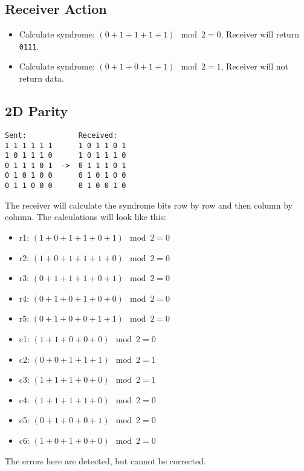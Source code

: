 \documentclass{article}
\begin{document}
\subsection*{Receiver Action}
\begin{itemize}
    \item Calculate syndrome: \((0 + 1 + 1 + 1 + 1) \mod 2 = 0\), Receiver will return \verb|0111|.
    \item Calculate syndrome: \((0 + 1 + 0 + 1 + 1) \mod 2 = 1\), Receiver will not return data.
\end{itemize}

\subsection*{2D Parity}

\begin{verbatim}
Sent:            Received:
1 1 1 1 1 1      1 0 1 1 0 1
1 0 1 1 1 0      1 0 1 1 1 0
0 1 1 1 0 1  ->  0 1 1 1 0 1
0 1 0 1 0 0      0 1 0 1 0 0
0 1 1 0 0 0      0 1 0 0 1 0
\end{verbatim}
The receiver will calculate the syndrome bits row by row and then column by column. The calculations will look like this:
\begin{itemize}
    \item r1: \((1 + 0 + 1 + 1 + 0 + 1) \mod 2 = 0\)
    \item r2: \((1 + 0 + 1 + 1 + 1 + 0) \mod 2 = 0\)
    \item r3: \((0 + 1 + 1 + 1 + 0 + 1) \mod 2 = 0\)
    \item r4: \((0 + 1 + 0 + 1 + 0 + 0) \mod 2 = 0\)
    \item r5: \((0 + 1 + 0 + 0 + 1 + 1) \mod 2 = 0\)
    \item c1: \((1 + 1 + 0 + 0 + 0) \mod 2 = 0\)
    \item c2: \((0 + 0 + 1 + 1 + 1) \mod 2 = 1\)
    \item c3: \((1 + 1 + 1 + 0 + 0) \mod 2 = 1\)
    \item c4: \((1 + 1 + 1 + 1 + 0) \mod 2 = 0\)
    \item c5: \((0 + 1 + 0 + 0 + 1) \mod 2 = 0\)
    \item c6: \((1 + 0 + 1 + 0 + 0) \mod 2 = 0\)
\end{itemize}

The errors here are detected, but cannot be corrected.
\end{document}

